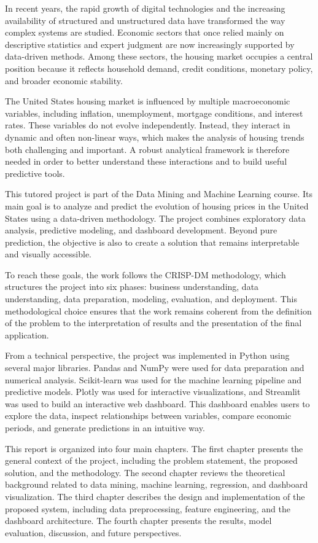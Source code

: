 
In recent years, the rapid growth of digital technologies and the increasing availability of structured and unstructured data have transformed the way complex systems are studied.
Economic sectors that once relied mainly on descriptive statistics and expert judgment are now increasingly supported by data-driven methods.
Among these sectors, the housing market occupies a central position because it reflects household demand, credit conditions, monetary policy, and broader economic stability.

The United States housing market is influenced by multiple macroeconomic variables, including inflation, unemployment, mortgage conditions, and interest rates.
These variables do not evolve independently.
Instead, they interact in dynamic and often non-linear ways, which makes the analysis of housing trends both challenging and important.
A robust analytical framework is therefore needed in order to better understand these interactions and to build useful predictive tools.

This tutored project is part of the Data Mining and Machine Learning course.
Its main goal is to analyze and predict the evolution of housing prices in the United States using a data-driven methodology.
The project combines exploratory data analysis, predictive modeling, and dashboard development.
Beyond pure prediction, the objective is also to create a solution that remains interpretable and visually accessible.

To reach these goals, the work follows the CRISP-DM methodology, which structures the project into six phases: business understanding, data understanding, data preparation, modeling, evaluation, and deployment.
This methodological choice ensures that the work remains coherent from the definition of the problem to the interpretation of results and the presentation of the final application.

From a technical perspective, the project was implemented in Python using several major libraries.
Pandas and NumPy were used for data preparation and numerical analysis.
Scikit-learn was used for the machine learning pipeline and predictive models.
Plotly was used for interactive visualizations, and Streamlit was used to build an interactive web dashboard.
This dashboard enables users to explore the data, inspect relationships between variables, compare economic periods, and generate predictions in an intuitive way.

This report is organized into four main chapters.
The first chapter presents the general context of the project, including the problem statement, the proposed solution, and the methodology.
The second chapter reviews the theoretical background related to data mining, machine learning, regression, and dashboard visualization.
The third chapter describes the design and implementation of the proposed system, including data preprocessing, feature engineering, and the dashboard architecture.
The fourth chapter presents the results, model evaluation, discussion, and future perspectives.

